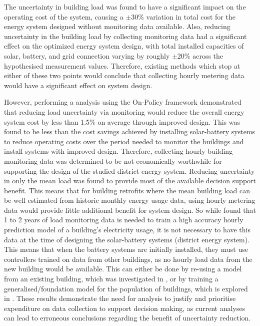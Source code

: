 The uncertainty in building load was found to have a significant impact on the operating cost of the system, causing a $\pm$30\% variation in total cost for the energy system designed without monitoring data available. Also, reducing uncertainty in the building load by collecting monitoring data had a significant effect on the optimized energy system design, with total installed capacities of solar, battery, and grid connection varying by roughly $\pm$20\% across the hypothesised measurement values. Therefore, existing methods which stop at either of these two points would conclude that collecting hourly metering data would have a significant effect on system design.

However, performing a  analysis using the On-Policy  framework demonstrated that reducing load uncertainty via monitoring would reduce the overall energy system cost by less than 1.5\% on average through improved design. This was found to be less than the cost savings achieved by installing solar-battery systems to reduce operating costs over the period needed to monitor the buildings and install systems with improved design. Therefore, collecting hourly building monitoring data was determined to be not economically worthwhile for supporting the design of the studied district energy system.
Reducing uncertainty in only the mean load was found to provide most of the available decision support benefit. This means that for building retrofits where the mean building load can be well estimated from historic monthly energy usage data, using hourly metering data would provide little additional benefit for system design.
So while  found that 1 to 2 years of load monitoring data is needed to train a high accuracy hourly prediction model of a building's electricity usage, it is not necessary to have this data at the time of designing the solar-battery systems (district energy system). This means that when the battery systems are initially installed, they must use controllers trained on data from other buildings, as no hourly load data from the new building would be available. This can either be done by re-using a model from an existing building, which was investigated in , or by training a generalised/foundation model for the population of buildings, which is explored in \citep{raisch2025AdaptingChangeComparison}.
These results demonstrate the need for  analysis to justify and prioritise expenditure on data collection to support decision making, as current analyses can lead to erroneous conclusions regarding the benefit of uncertainty reduction.

